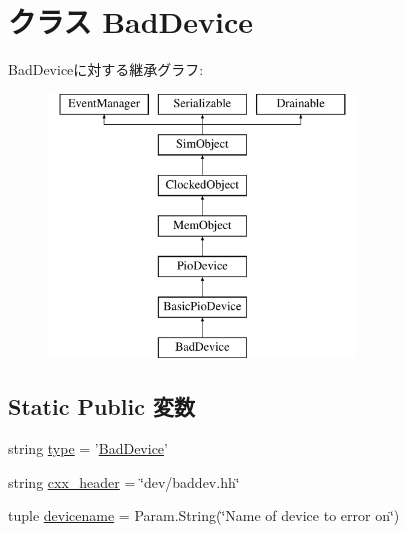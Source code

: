 \hypertarget{classBadDevice_1_1BadDevice}{
\section{クラス BadDevice}
\label{classBadDevice_1_1BadDevice}
}
BadDeviceに対する継承グラフ:\begin{figure}[H]
\begin{center}
\leavevmode
\includegraphics[height=7cm]{classBadDevice_1_1BadDevice}
\end{center}
\end{figure}
\subsection*{Static Public 変数}
\begin{DoxyCompactItemize}
\item 
string \hyperlink{classBadDevice_1_1BadDevice_acce15679d830831b0bbe8ebc2a60b2ca}{type} = '\hyperlink{classBadDevice_1_1BadDevice}{BadDevice}'
\item 
string \hyperlink{classBadDevice_1_1BadDevice_a17da7064bc5c518791f0c891eff05fda}{cxx\_\-header} = \char`\"{}dev/baddev.hh\char`\"{}
\item 
tuple \hyperlink{classBadDevice_1_1BadDevice_af7bdc8f0c2d972fc118fe96c89525de6}{devicename} = Param.String(\char`\"{}Name of device to error on\char`\"{})
\end{DoxyCompactItemize}


